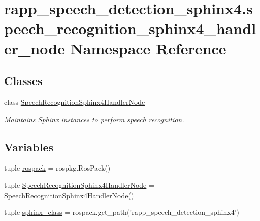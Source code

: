\hypertarget{namespacerapp__speech__detection__sphinx4_1_1speech__recognition__sphinx4__handler__node}{\section{rapp\-\_\-speech\-\_\-detection\-\_\-sphinx4.\-speech\-\_\-recognition\-\_\-sphinx4\-\_\-handler\-\_\-node Namespace Reference}
\label{namespacerapp__speech__detection__sphinx4_1_1speech__recognition__sphinx4__handler__node}
}
\subsection*{Classes}
\begin{DoxyCompactItemize}
\item 
class \hyperlink{classrapp__speech__detection__sphinx4_1_1speech__recognition__sphinx4__handler__node_1_1SpeechRecognitionSphinx4HandlerNode}{Speech\-Recognition\-Sphinx4\-Handler\-Node}
\begin{DoxyCompactList}\small\item\em Maintains Sphinx instances to perform speech recognition. \end{DoxyCompactList}\end{DoxyCompactItemize}
\subsection*{Variables}
\begin{DoxyCompactItemize}
\item 
tuple \hyperlink{namespacerapp__speech__detection__sphinx4_1_1speech__recognition__sphinx4__handler__node_a43af84982c3e86720b3e4812674439d0}{rospack} = rospkg.\-Ros\-Pack()
\item 
tuple \hyperlink{namespacerapp__speech__detection__sphinx4_1_1speech__recognition__sphinx4__handler__node_ace55376f7271074fc9bcd18214509dbc}{Speech\-Recognition\-Sphinx4\-Handler\-Node} = \hyperlink{classrapp__speech__detection__sphinx4_1_1speech__recognition__sphinx4__handler__node_1_1SpeechRecognitionSphinx4HandlerNode}{Speech\-Recognition\-Sphinx4\-Handler\-Node}()
\item 
tuple \hyperlink{namespacerapp__speech__detection__sphinx4_1_1speech__recognition__sphinx4__handler__node_a6e5653796d4a0ce39db8711e77770610}{sphinx\-\_\-class} = rospack.\-get\-\_\-path('rapp\-\_\-speech\-\_\-detection\-\_\-sphinx4')
\end{DoxyCompactItemize}


